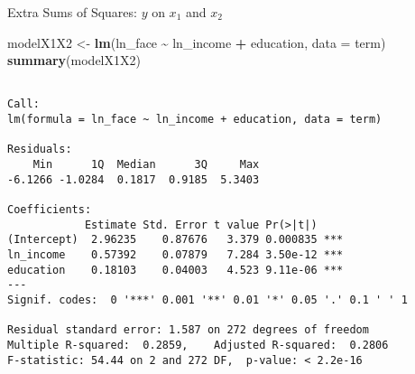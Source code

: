 \documentclass[
  ignorenonframetext,
]{beamer}
\newenvironment{Shaded}{\begin{snugshade}}{\end{snugshade}}
\newcommand{\AttributeTok}[1]{\textcolor[rgb]{0.13,0.29,0.53}{#1}}
\newcommand{\FunctionTok}[1]{\textcolor[rgb]{0.13,0.29,0.53}{\textbf{#1}}}
\newcommand{\NormalTok}[1]{#1}
\newcommand{\OtherTok}[1]{\textcolor[rgb]{0.56,0.35,0.01}{#1}}
\newcommand{\SpecialCharTok}[1]{\textcolor[rgb]{0.81,0.36,0.00}{\textbf{#1}}}
\begin{document}
\begin{frame}[fragile]{Extra Sums of Squares: \(y\) on \(x_1\) and
\(x_2\)}
\protect\hypertarget{extra-sums-of-squares-y-on-x_1-and-x_2}{}
\footnotesize

\begin{Shaded}
\begin{Highlighting}[]
\NormalTok{modelX1X2 }\OtherTok{\textless{}{-}} \FunctionTok{lm}\NormalTok{(ln\_face }\SpecialCharTok{\textasciitilde{}}\NormalTok{ ln\_income }\SpecialCharTok{+}\NormalTok{ education, }\AttributeTok{data =}\NormalTok{ term)}
\FunctionTok{summary}\NormalTok{(modelX1X2)}
\end{Highlighting}
\end{Shaded}

\begin{verbatim}

Call:
lm(formula = ln_face ~ ln_income + education, data = term)

Residuals:
    Min      1Q  Median      3Q     Max 
-6.1266 -1.0284  0.1817  0.9185  5.3403 

Coefficients:
            Estimate Std. Error t value Pr(>|t|)    
(Intercept)  2.96235    0.87676   3.379 0.000835 ***
ln_income    0.57392    0.07879   7.284 3.50e-12 ***
education    0.18103    0.04003   4.523 9.11e-06 ***
---
Signif. codes:  0 '***' 0.001 '**' 0.01 '*' 0.05 '.' 0.1 ' ' 1

Residual standard error: 1.587 on 272 degrees of freedom
Multiple R-squared:  0.2859,    Adjusted R-squared:  0.2806 
F-statistic: 54.44 on 2 and 272 DF,  p-value: < 2.2e-16
\end{verbatim}

\normalsize
\end{frame}
\end{document}
